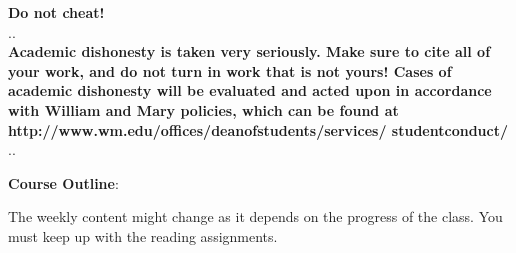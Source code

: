 \documentclass[11pt]{article}
\begin{document}
\vspace{4mm}
\textbf {\LARGE Do not cheat!} \\
.\hrulefill . \\
\textbf{Academic dishonesty is taken very seriously.  Make sure to cite all of your work, and do not turn in work that is not yours!  Cases of academic dishonesty will be evaluated and acted upon in accordance with William and Mary policies, which can be found at http://www.wm.edu/offices/deanofstudents/services/
studentconduct/} \\
.\hrulefill . \\
\vspace{10mm}

\newpage 
\textbf {\large Course Outline}:

The weekly content might change as it depends on the progress of the class.  You must keep up with the reading assignments.
\end{document}
